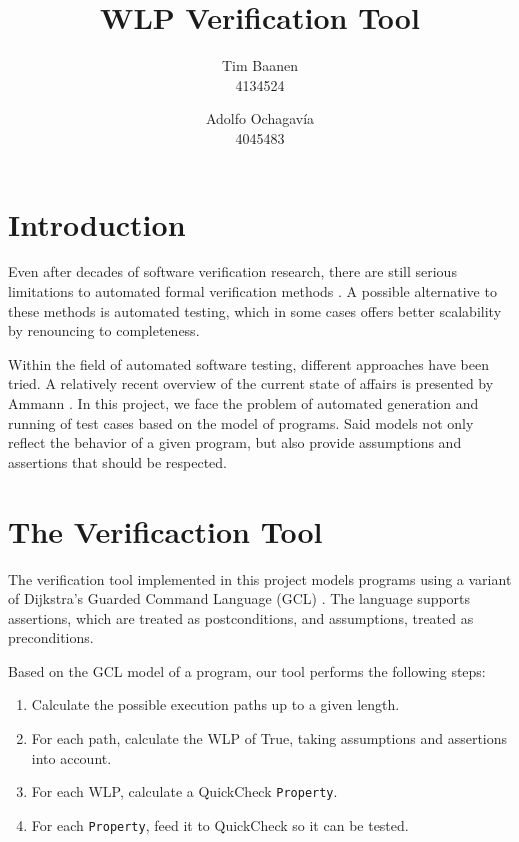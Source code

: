 \documentclass[a4paper]{article}
\author{
  Tim Baanen\\4134524
  \and
  Adolfo Ochagavía\\4045483
}
\title{WLP Verification Tool}
\begin{document}
\maketitle

\section{Introduction}

Even after decades of software verification research, there are still serious
limitations to automated formal verification methods \cite{d2008survey}. A
possible alternative to these methods is automated testing, which in some cases
offers better scalability by renouncing to completeness.

Within the field of automated software testing, different approaches have been
tried. A relatively recent overview of the current state of affairs is
presented by Ammann \cite{ammann2008introduction}. In this project, we face
the problem of automated generation and running of test cases based on the
model of programs. Said models not only reflect the behavior of a given
program, but also provide assumptions and assertions that should be respected.


\section{The Verificaction Tool}

The verification tool implemented in this project models programs using a
variant of Dijkstra's Guarded Command Language (GCL) \cite{Dijkstra:gcl}.
The language supports assertions, which are treated as postconditions,
and assumptions, treated as preconditions.

Based on the GCL model of a program, our tool performs the following steps:

\begin{enumerate}
\item Calculate the possible execution paths up to a given length.
\item For each path, calculate the WLP of True, taking assumptions and assertions into account.
\item For each WLP, calculate a QuickCheck \cite{claessen2011quickcheck} \texttt{Property}.
\item For each \texttt{Property}, feed it to QuickCheck so it can be tested.
\end{enumerate}
\end{document}
